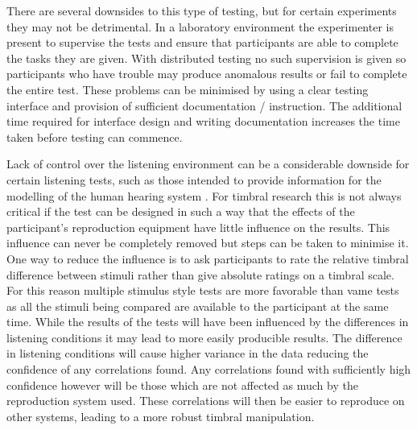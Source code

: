 			There are several downsides to this type of testing, but for certain experiments they may not be
			detrimental. In a laboratory environment the experimenter is present to supervise the tests and
			ensure that participants are able to complete the tasks they are given.  With distributed testing
			no such supervision is given so participants who have trouble may produce anomalous results or
			fail to complete the entire test. These problems can be minimised by using a clear testing
			interface and provision of sufficient documentation / instruction. The additional time required for
			interface design and writing documentation increases the time taken before testing can commence.

			Lack of control over the listening environment can be a considerable downside for certain listening
			tests, such as those intended to provide information for the modelling of the human hearing system
			\citep{moore1990auditory}. For timbral research this is not always critical if the test can be
			designed in such a way that the effects of the participant's reproduction equipment have little
			influence on the results. This influence can never be completely removed but steps can be taken to
			minimise it.  One way to reduce the influence is to ask participants to rate the relative timbral
			difference between stimuli rather than give absolute ratings on a timbral scale. For this reason
			multiple stimulus style tests are more favorable than \acrshort{vame} tests as all the stimuli
			being compared are available to the participant at the same time. While the results of the tests
			will have been influenced by the differences in listening conditions it may lead to more easily
			producible results. The difference in listening conditions will cause higher variance in the data
			reducing the confidence of any correlations found. Any correlations found with sufficiently high
			confidence however will be those which are not affected as much by the reproduction system used.
			These correlations will then be easier to reproduce on other systems, leading to a more robust
			timbral manipulation.

